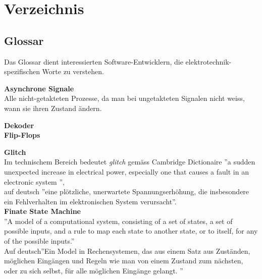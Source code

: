 
\chapter{Verzeichnis}\label{chap.verzeichnis}



\makeatletter
\renewcommand*\bib@heading{ \section{\refname}}
\makeatother



 


\section{Glossar}\label{sect.verzeichnis_glossar}
Das Glossar dient interessierten Software-Entwicklern, die elektrotechnik-spezifischen Worte zu verstehen.

\textbf{Asynchrone Signale}\\
Alle nicht-getakteten Prozesse, da man bei ungetakteten Signalen nicht weiss, wann sie ihren Zustand ändern.

\textbf{Dekoder}\\

\textbf{Flip-Flops}

\textbf{Glitch}\\
Im technischem Bereich bedeutet \textit{glitch} gemäss Cambridge Dictionaire ''a sudden unexpected increase in electrical power, especially one that causes a fault in an electronic system ''\cite{dictionair},\\
auf deutsch ''eine plötzliche, unerwartete Spannungserhöhung, die insbesondere ein Fehlverhalten im elektronischen System verursacht''.\\


\textbf{Finate State Machine}\\
''A model of a computational system, consisting of a set of states, a set of possible inputs, and a rule to map each state to another state, or to itself, for any of the possible inputs.''\cite{fsm}\\
Auf deutsch''Ein Model in Rechensystemen, das aus einem Satz aus Zuständen, möglichen Eingängen und Regeln wie man von einem Zustand zum nächsten, oder zu sich selbst, für alle möglichen Eingänge gelangt. ''\\




